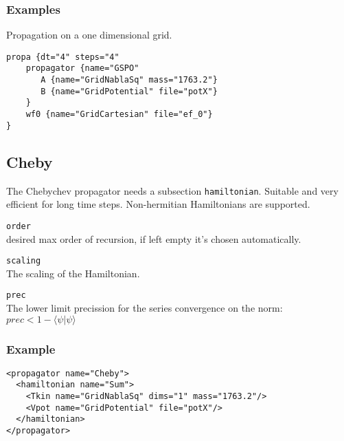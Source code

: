 \documentclass[a4paper,12pt]{scrbook}
\newcommand{\option}[2]{\item \texttt{#1}\\ #2}
\begin{document}
\subsubsection*{Examples}
Propagation on a one dimensional grid.
\begin{verbatim}
propa {dt="4" steps="4"
    propagator {name="GSPO"
       A {name="GridNablaSq" mass="1763.2"}
       B {name="GridPotential" file="potX"}
    }
    wf0 {name="GridCartesian" file="ef_0"}
}
\end{verbatim}

\subsection{Cheby}
The Chebychev propagator \cite{Ezer84} needs a subsection \verb|hamiltonian|.
Suitable and very efficient for long time steps. Non-hermitian Hamiltonians are supported.
\begin{options}
 \option{order}{desired max order of recursion, if left empty it's chosen automatically.}
 \option{scaling}{The scaling of the Hamiltonian. %
 }
 \option{prec}{The lower limit precission for the series convergence on the norm: $prec < 1-\langle \psi|\psi \rangle$}
\end{options}

\subsubsection*{Example}
\begin{verbatim}
<propagator name="Cheby">
  <hamiltonian name="Sum">
    <Tkin name="GridNablaSq" dims="1" mass="1763.2"/>
    <Vpot name="GridPotential" file="potX"/>
  </hamiltonian>
</propagator>
\end{verbatim}
\end{document}
